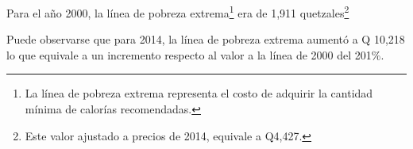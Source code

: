 Para el año 2000, la línea de pobreza extrema\footnote{La línea de pobreza extrema representa el costo de adquirir la cantidad mínima de calorías recomendadas.} era de 1,911 quetzales\footnote{Este valor   ajustado a precios de 2014, equivale a Q4,427. }




 
 Puede observarse  que para 2014, la línea de pobreza extrema aumentó a Q 10,218 lo que equivale a un incremento respecto al valor a la línea de 2000 del 201\%.